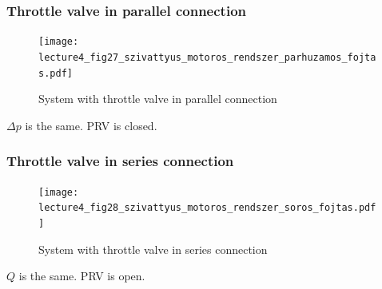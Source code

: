 \subsubsection{Throttle valve in parallel connection}
\begin{figure}[tbh]
\begin{center}
\texttt{[image: lecture4\_fig27\_szivattyus\_motoros\_rendszer\_parhuzamos\_fojtas.pdf]}
\caption{\label{fig:throttle_valve_parallel}System with throttle valve in parallel connection}
\end{center}
\end{figure}
$\Delta p$ is the same. PRV is closed.

\subsubsection{Throttle valve in series connection}
\begin{figure}[tbh]
\begin{center}
\texttt{[image: lecture4\_fig28\_szivattyus\_motoros\_rendszer\_soros\_fojtas.pdf]}
\caption{\label{fig:throttle_valve_series}System with throttle valve in series connection}
\end{center}
\end{figure}
$Q$ is the same. PRV is open.

%








\clearpage


